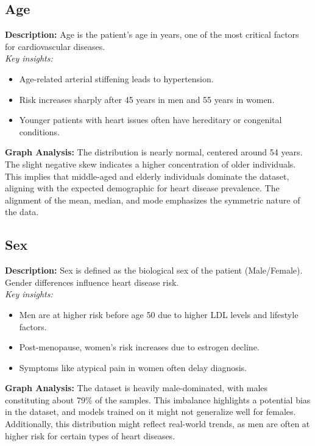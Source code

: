 \documentclass[pdflatex,sn-nature,Numbered]{sn-jnl}%
\theoremstyle{thmstyleone}%
\theoremstyle{thmstyletwo}%
\theoremstyle{thmstylethree}%
\begin{document}
\subsection{Age}
\textbf{Description:} 
Age is the patient’s age in years, one of the most critical factors for cardiovascular diseases. \\
\textit{Key insights:}
\begin{itemize}
    \item Age-related arterial stiffening leads to hypertension.
    \item Risk increases sharply after 45 years in men and 55 years in women.
    \item Younger patients with heart issues often have hereditary or congenital conditions.
\end{itemize}
\textbf{Graph Analysis:} 
The distribution is nearly normal, centered around 54 years. The slight negative skew indicates a higher concentration of older individuals. This implies that middle-aged and elderly individuals dominate the dataset, aligning with the expected demographic for heart disease prevalence. The alignment of the mean, median, and mode emphasizes the symmetric nature of the data.

\subsection{Sex}
\textbf{Description:} 
Sex is defined as the biological sex of the patient (Male/Female). Gender differences influence heart disease risk. \\
\textit{Key insights:}
\begin{itemize}
    \item Men are at higher risk before age 50 due to higher LDL levels and lifestyle factors.
    \item Post-menopause, women’s risk increases due to estrogen decline.
    \item Symptoms like atypical pain in women often delay diagnosis.
\end{itemize}
\textbf{Graph Analysis:} 
The dataset is heavily male-dominated, with males constituting about 79\% of the samples. This imbalance highlights a potential bias in the dataset, and models trained on it might not generalize well for females. Additionally, this distribution might reflect real-world trends, as men are often at higher risk for certain types of heart diseases.
\end{document}
